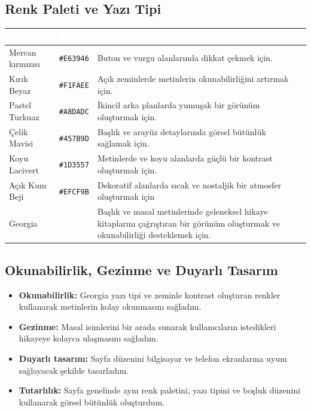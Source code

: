 \documentclass[12pt,a4paper]{article}
\begin{document}
\subsection{Renk Paleti ve Yazı Tipi}
\begin{center}
\begin{tabular}{@{}llp{6.4cm}@{}}
\toprule
\rowcolor{ana}\textcolor{white}{\textbf{Ad}} & \textcolor{white}{\textbf{Kod}} & \textcolor{white}{\textbf{Nerede / neden kullandınız?}} \\
\midrule
\relax Mercan kırmızısı & \texttt{\#E63946} & Buton ve vurgu alanlarında dikkat çekmek için. \\
\relax Kırık Beyaz & \texttt{\#F1FAEE} & Açık zeminlerde metinlerin okunabilirliğini artırmak için. \\
\relax Pastel Turkuaz & \texttt{\#A8DADC} & İkincil arka planlarda yumuşak bir görünüm oluşturmak için. \\
\relax Çelik Mavisi & \texttt{\#457B9D} & Başlık ve arayüz detaylarında görsel bütünlük sağlamak için. \\
\relax Koyu Lacivert & \texttt{\#1D3557} & Metinlerde ve koyu alanlarda güçlü bir kontrast oluşturmak için. \\
\relax Açık Kum Beji & \texttt{\#EFCF9B} & Dekoratif alanlarda sıcak ve nostaljik bir atmosfer oluşturmak için \\
\relax Georgia &  & Başlık ve masal metinlerinde geleneksel hikaye kitaplarını çağrıştıran bir görünüm oluşturmak ve okunabilirliği desteklemek için. \\
\bottomrule
\end{tabular}
\end{center}

\subsection{Okunabilirlik, Gezinme ve Duyarlı Tasarım}
\begin{itemize}
  \item \textbf{Okunabilirlik:} Georgia yazı tipi ve zeminle kontrast oluşturan renkler kullanarak metinlerin kolay okunmasını sağladım.
  \item \textbf{Gezinme:} Masal isimlerini bir arada sunarak kullanıcıların istedikleri hikayeye kolayca ulaşmasını sağladım.
  \item \textbf{Duyarlı tasarım:} Sayfa düzenini bilgisayar ve telefon ekranlarına uyum sağlayacak şekilde tasarladım.
  \item \textbf{Tutarlılık:} Sayfa genelinde aynı renk paletini, yazı tipini ve boşluk düzenini kullanarak görsel bütünlük oluşturdum.
\end{itemize}
\end{document}
